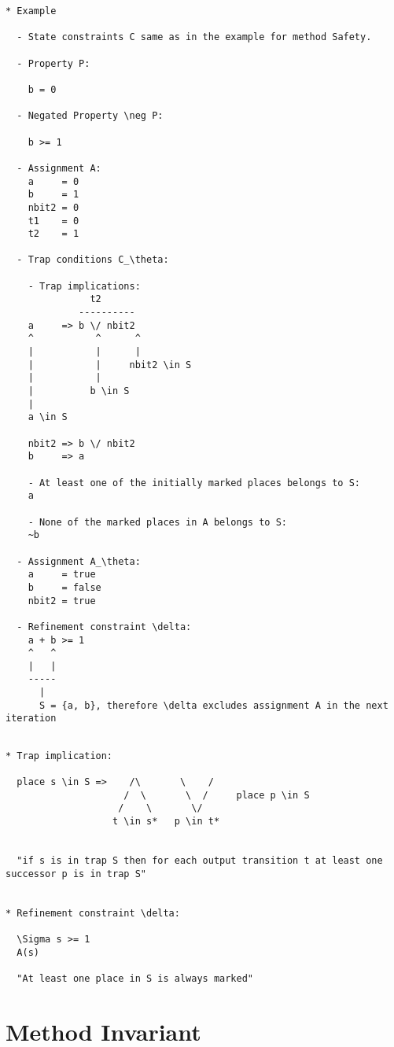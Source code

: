 \documentclass{llncs}
\begin{document}
\begin{verbatim}
* Example

  - State constraints C same as in the example for method Safety.
 
  - Property P:

    b = 0 
  
  - Negated Property \neg P:
    
    b >= 1

  - Assignment A:
    a     = 0
    b     = 1
    nbit2 = 0
    t1    = 0
    t2    = 1

  - Trap conditions C_\theta:

    - Trap implications:
               t2
             ----------
    a     => b \/ nbit2
    ^           ^      ^
    |           |      |
    |           |     nbit2 \in S
    |           |
    |          b \in S
    |
    a \in S
    
    nbit2 => b \/ nbit2
    b     => a

    - At least one of the initially marked places belongs to S:
    a

    - None of the marked places in A belongs to S:
    ~b
  
  - Assignment A_\theta:
    a     = true
    b     = false
    nbit2 = true

  - Refinement constraint \delta:
    a + b >= 1
    ^   ^
    |   |
    -----
      |
      S = {a, b}, therefore \delta excludes assignment A in the next iteration
\end{verbatim}

\newpage

\begin{verbatim}

* Trap implication:

  place s \in S =>    /\       \    /
                     /  \       \  /     place p \in S
                    /    \       \/
                   t \in s*   p \in t*   


  "if s is in trap S then for each output transition t at least one successor p is in trap S"


* Refinement constraint \delta:

  \Sigma s >= 1  
  A(s)

  "At least one place in S is always marked"
\end{verbatim}

\newpage

\section{Method Invariant}
\end{document}
